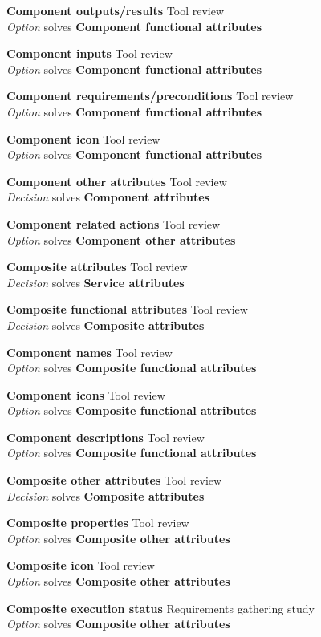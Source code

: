 \textbf{Component outputs/results} \hfill Tool review \\ \emph{Option} \hfill solves \textbf{Component functional attributes}

\textbf{Component inputs} \hfill Tool review \\ \emph{Option} \hfill solves \textbf{Component functional attributes}

\textbf{Component requirements/preconditions} \hfill Tool review \\ \emph{Option} \hfill solves \textbf{Component functional attributes}

\textbf{Component icon} \hfill Tool review \\ \emph{Option} \hfill solves \textbf{Component functional attributes}

\textbf{Component other attributes} \hfill Tool review \\ \emph{Decision} \hfill solves \textbf{Component attributes}

\textbf{Component related actions} \hfill Tool review \\ \emph{Option} \hfill solves \textbf{Component other attributes}

\textbf{Composite attributes} \hfill Tool review \\ \emph{Decision} \hfill solves \textbf{Service attributes}

\textbf{Composite functional attributes} \hfill Tool review \\ \emph{Decision} \hfill solves \textbf{Composite attributes}

\textbf{Component names} \hfill Tool review \\ \emph{Option} \hfill solves \textbf{Composite functional attributes}

\textbf{Component icons} \hfill Tool review \\ \emph{Option} \hfill solves \textbf{Composite functional attributes}

\textbf{Component descriptions} \hfill Tool review \\ \emph{Option} \hfill solves \textbf{Composite functional attributes}

\textbf{Composite other attributes} \hfill Tool review \\ \emph{Decision} \hfill solves \textbf{Composite attributes}

\textbf{Composite properties} \hfill Tool review \\ \emph{Option} \hfill solves \textbf{Composite other attributes}

\textbf{Composite icon} \hfill Tool review \\ \emph{Option} \hfill solves \textbf{Composite other attributes}

\textbf{Composite execution status} \hfill Requirements gathering study \\ \emph{Option} \hfill solves \textbf{Composite other attributes}
